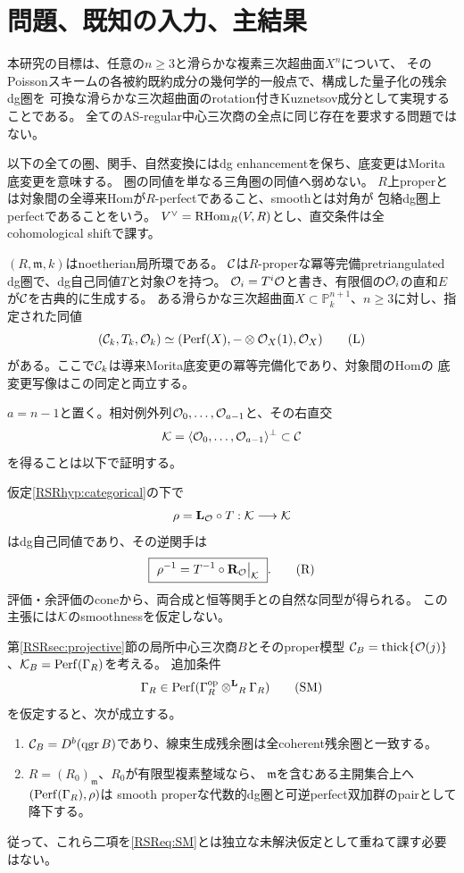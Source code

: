 \section{問題、既知の入力、主結果}\label{RSRsec:intro}
本研究の目標は、任意の$n\ge3$と滑らかな複素三次超曲面$X^n$について、
そのPoissonスキームの各被約既約成分の幾何学的一般点で、構成した量子化の残余dg圏を
可換な滑らかな三次超曲面のrotation付きKuznetsov成分として実現することである。
全てのAS-regular中心三次商の全点に同じ存在を要求する問題ではない。

以下の全ての圏、関手、自然変換にはdg enhancementを保ち、底変更はMorita底変更を意味する。
圏の同値を単なる三角圏の同値へ弱めない。
$R$上properとは対象間の全導来Homが$R$-perfectであること、smoothとは対角が
包絡dg圏上perfectであることをいう。
$V^\vee=\operatorname{RHom}_R(V,R)$とし、直交条件は全cohomological shiftで課す。

\begin{hypothesis}[局所圏論的入力]\label{RSRhyp:categorical}
$(R,\mathfrak m,k)$はnoetherian局所環である。
$\mathcal C$は$R$-properな冪等完備pretriangulated dg圏で、dg自己同値$T$と対象$\mathcal O$を持つ。
$\mathcal O_i=T^i\mathcal O$と書き、有限個の$\mathcal O_i$の直和$E$が$\mathcal C$を古典的に生成する。
ある滑らかな三次超曲面$X\subset\mathbb P^{n+1}_k$、$n\ge3$に対し、指定された同値
\[
 (\mathcal C_k,T_k,\mathcal O_k)\simeq(\operatorname{Perf}(X),-\otimes\mathcal O_X(1),\mathcal O_X)
 \tag{L}\label{RSReq:local-input}
\]
がある。ここで$\mathcal C_k$は導来Morita底変更の冪等完備化であり、対象間のHomの
底変更写像はこの同定と両立する。
\end{hypothesis}

$a=n-1$と置く。相対例外列$\mathcal O_0,\ldots,\mathcal O_{a-1}$と、その右直交
\[
 \mathcal K=\langle\mathcal O_0,\ldots,\mathcal O_{a-1}\rangle^\perp\subset\mathcal C
\]
を得ることは以下で証明する。

\begin{theorem}[rotationの自己同値性]\label{RSRthm:rotation}
仮定\ref{RSRhyp:categorical}の下で
\[
 \rho=\mathbf L_{\mathcal O}\circ T:\mathcal K\longrightarrow\mathcal K
\]
はdg自己同値であり、その逆関手は
\[
 \boxed{\ \rho^{-1}=T^{-1}\circ\RR_{\OO}\big|_{\cK}\ }.
 \tag{R}\label{RSReq:inverse}
\]
評価・余評価のconeから、両合成と恒等関手との自然な同型が得られる。
この主張には$\mathcal K$のsmoothnessを仮定しない。
\end{theorem}

\begin{theorem}[saturation後に従う二つの帰結]\label{RSRthm:summary}
第\ref{RSRsec:projective}節の局所中心三次商$B$とそのproper模型
$\mathcal C_B=\operatorname{thick}\{\mathcal O(j)\}$、$\mathcal K_B=\operatorname{Perf}(\Gamma_R)$を考える。
追加条件
\[
 \Gamma_R\in\operatorname{Perf}(\Gamma_R^{\mathrm{op}}\mathbin{\otimes^{\mathbf L}}_R\Gamma_R)
 \tag{SM}\label{RSReq:SM}
\]
を仮定すると、次が成立する。
\begin{enumerate}[label=(\arabic*)]
\item $\mathcal C_B=D^b(\operatorname{qgr} B)$であり、線束生成残余圏は全coherent残余圏と一致する。
\item $R=(R_0)_{\mathfrak m}$、$R_0$が有限型複素整域なら、
$\mathfrak m$を含むある主開集合上へ$(\operatorname{Perf}(\Gamma_R),\rho)$は
smooth properな代数的dg圏と可逆perfect双加群のpairとして降下する。
\end{enumerate}
従って、これら二項を\eqref{RSReq:SM}とは独立な未解決仮定として重ねて課す必要はない。
\end{theorem}

